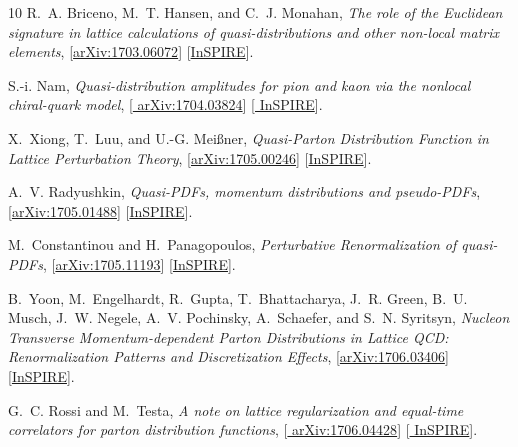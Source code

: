 \begin{thebibliography}{10}
R.~A. Briceno, M.~T. Hansen, and C.~J. Monahan,
{\it {The role of the Euclidean signature in lattice calculations of
  quasi-distributions and other non-local matrix elements}},
  [\href{http://arxiv.org/abs/1703.06072}{{\ttfamily arXiv:1703.06072}}]
  [\href{http://inspirehep.net/record/1518148}{{\ttfamily InSPIRE}}].

S.-i. Nam,
{\it {Quasi-distribution amplitudes for pion and kaon via the nonlocal
  chiral-quark model}},  [\href{http://arxiv.org/abs/1704.03824}{{\ttfamily
  arXiv:1704.03824}}] [\href{http://inspirehep.net/record/1591333}{{\ttfamily
  InSPIRE}}].

X.~Xiong, T.~Luu, and U.-G. Mei{\ss}ner,
{\it {Quasi-Parton Distribution Function in Lattice Perturbation Theory}},
  [\href{http://arxiv.org/abs/1705.00246}{{\ttfamily arXiv:1705.00246}}]
  [\href{http://inspirehep.net/record/1597417}{{\ttfamily InSPIRE}}].

A.~V. Radyushkin,
{\it {Quasi-PDFs, momentum distributions and pseudo-PDFs}},
  [\href{http://arxiv.org/abs/1705.01488}{{\ttfamily arXiv:1705.01488}}]
  [\href{http://inspirehep.net/record/1598042}{{\ttfamily InSPIRE}}].

M.~Constantinou and H.~Panagopoulos,
{\it {Perturbative Renormalization of quasi-PDFs}},
  [\href{http://arxiv.org/abs/1705.11193}{{\ttfamily arXiv:1705.11193}}]
  [\href{http://inspirehep.net/record/1601910}{{\ttfamily InSPIRE}}].

B.~Yoon, M.~Engelhardt, R.~Gupta, T.~Bhattacharya, J.~R. Green, B.~U. Musch,
  J.~W. Negele, A.~V. Pochinsky, A.~Schaefer, and S.~N. Syritsyn,
{\it {Nucleon Transverse Momentum-dependent Parton Distributions in Lattice
  QCD: Renormalization Patterns and Discretization Effects}},
  [\href{http://arxiv.org/abs/1706.03406}{{\ttfamily arXiv:1706.03406}}]
  [\href{http://inspirehep.net/record/1604278}{{\ttfamily InSPIRE}}].

G.~C. Rossi and M.~Testa,
{\it {A note on lattice regularization and equal-time correlators for parton
  distribution functions}},  [\href{http://arxiv.org/abs/1706.04428}{{\ttfamily
  arXiv:1706.04428}}] [\href{http://inspirehep.net/record/1605132}{{\ttfamily
  InSPIRE}}].


\end{thebibliography}
